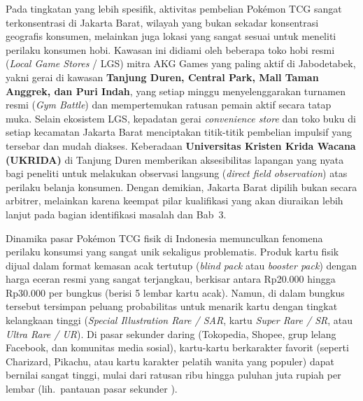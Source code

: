 \documentclass[12pt,a4paper]{article}
\numberwithin{equation}{section}
\numberwithin{table}{section}
\numberwithin{figure}{section}
\begin{document}
Pada tingkatan yang lebih spesifik, aktivitas pembelian Pok\'emon TCG sangat terkonsentrasi di Jakarta Barat, wilayah yang bukan sekadar konsentrasi geografis konsumen, melainkan juga lokasi yang sangat sesuai untuk meneliti perilaku konsumen hobi. Kawasan ini didiami oleh beberapa toko hobi resmi (\emph{Local Game Stores} / LGS) mitra AKG Games yang paling aktif di Jabodetabek, yakni gerai di kawasan \textbf{Tanjung Duren, Central Park, Mall Taman Anggrek, dan Puri Indah}, yang setiap minggu menyelenggarakan turnamen resmi (\emph{Gym Battle}) dan mempertemukan ratusan pemain aktif secara tatap muka. Selain ekosistem LGS, kepadatan gerai \emph{convenience store} dan toko buku di setiap kecamatan Jakarta Barat menciptakan titik-titik pembelian impulsif yang tersebar dan mudah diakses. Keberadaan \textbf{Universitas Kristen Krida Wacana (UKRIDA)} di Tanjung Duren memberikan aksesibilitas lapangan yang nyata bagi peneliti untuk melakukan observasi langsung (\emph{direct field observation}) atas perilaku belanja konsumen. Dengan demikian, Jakarta Barat dipilih bukan secara arbitrer, melainkan karena keempat pilar kualifikasi yang akan diuraikan lebih lanjut pada bagian identifikasi masalah dan Bab~3.

Dinamika pasar Pok\'emon TCG fisik di Indonesia memunculkan fenomena perilaku konsumsi yang sangat unik sekaligus problematis. Produk kartu fisik dijual dalam format kemasan acak tertutup (\emph{blind pack} atau \emph{booster pack}) dengan harga eceran resmi yang sangat terjangkau, berkisar antara Rp20.000 hingga Rp30.000 per bungkus (berisi 5 lembar kartu acak). Namun, di dalam bungkus tersebut tersimpan peluang probabilitas untuk menarik kartu dengan tingkat kelangkaan tinggi (\emph{Special Illustration Rare / SAR}, kartu \emph{Super Rare / SR}, atau \emph{Ultra Rare / UR}). Di pasar sekunder daring (Tokopedia, Shopee, grup lelang Facebook, dan komunitas media sosial), kartu-kartu berkarakter favorit (seperti Charizard, Pikachu, atau kartu karakter pelatih wanita yang populer) dapat bernilai sangat tinggi, mulai dari ratusan ribu hingga puluhan juta rupiah per lembar (lih.\ pantauan pasar sekunder \citep{pricecharting2024}).
\end{document}
